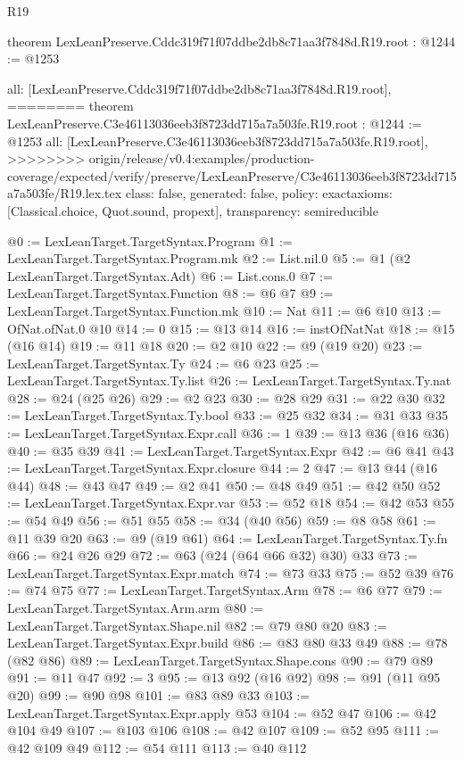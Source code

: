 \begin{lexlean}{R19}
\begin{coremodule}
{{{{{{{{{{{{{theorem LexLeanPreserve.Cddc319f71f07ddbe2db8c71aa3f7848d.R19.root : @1244 := @1253 {
  all: [LexLeanPreserve.Cddc319f71f07ddbe2db8c71aa3f7848d.R19.root],
========
theorem LexLeanPreserve.C3e46113036eeb3f8723dd715a7a503fe.R19.root : @1244 := @1253 {
  all: [LexLeanPreserve.C3e46113036eeb3f8723dd715a7a503fe.R19.root],
>>>>>>>> origin/release/v0.4:examples/production-coverage/expected/verify/preserve/LexLeanPreserve/C3e46113036eeb3f8723dd715a7a503fe/R19.lex.tex
  class: false,
  generated: false,
  policy: exact{axioms: [Classical.choice, Quot.sound, propext]},
  transparency: semireducible
}

@0 := LexLeanTarget.TargetSyntax.Program
@1 := LexLeanTarget.TargetSyntax.Program.mk
@2 := List.nil.{0}
@5 := @1 (@2 LexLeanTarget.TargetSyntax.Adt)
@6 := List.cons.{0}
@7 := LexLeanTarget.TargetSyntax.Function
@8 := @6 @7
@9 := LexLeanTarget.TargetSyntax.Function.mk
@10 := Nat
@11 := @6 @10
@13 := OfNat.ofNat.{0} @10
@14 := 0
@15 := @13 @14
@16 := instOfNatNat
@18 := @15 (@16 @14)
@19 := @11 @18
@20 := @2 @10
@22 := @9 (@19 @20)
@23 := LexLeanTarget.TargetSyntax.Ty
@24 := @6 @23
@25 := LexLeanTarget.TargetSyntax.Ty.list
@26 := LexLeanTarget.TargetSyntax.Ty.nat
@28 := @24 (@25 @26)
@29 := @2 @23
@30 := @28 @29
@31 := @22 @30
@32 := LexLeanTarget.TargetSyntax.Ty.bool
@33 := @25 @32
@34 := @31 @33
@35 := LexLeanTarget.TargetSyntax.Expr.call
@36 := 1
@39 := @13 @36 (@16 @36)
@40 := @35 @39
@41 := LexLeanTarget.TargetSyntax.Expr
@42 := @6 @41
@43 := LexLeanTarget.TargetSyntax.Expr.closure
@44 := 2
@47 := @13 @44 (@16 @44)
@48 := @43 @47
@49 := @2 @41
@50 := @48 @49
@51 := @42 @50
@52 := LexLeanTarget.TargetSyntax.Expr.var
@53 := @52 @18
@54 := @42 @53
@55 := @54 @49
@56 := @51 @55
@58 := @34 (@40 @56)
@59 := @8 @58
@61 := @11 @39 @20
@63 := @9 (@19 @61)
@64 := LexLeanTarget.TargetSyntax.Ty.fn
@66 := @24 @26 @29
@72 := @63 (@24 (@64 @66 @32) @30) @33
@73 := LexLeanTarget.TargetSyntax.Expr.match
@74 := @73 @33
@75 := @52 @39
@76 := @74 @75
@77 := LexLeanTarget.TargetSyntax.Arm
@78 := @6 @77
@79 := LexLeanTarget.TargetSyntax.Arm.arm
@80 := LexLeanTarget.TargetSyntax.Shape.nil
@82 := @79 @80 @20
@83 := LexLeanTarget.TargetSyntax.Expr.build
@86 := @83 @80 @33 @49
@88 := @78 (@82 @86)
@89 := LexLeanTarget.TargetSyntax.Shape.cons
@90 := @79 @89
@91 := @11 @47
@92 := 3
@95 := @13 @92 (@16 @92)
@98 := @91 (@11 @95 @20)
@99 := @90 @98
@101 := @83 @89 @33
@103 := LexLeanTarget.TargetSyntax.Expr.apply @53
@104 := @52 @47
@106 := @42 @104 @49
@107 := @103 @106
@108 := @42 @107
@109 := @52 @95
@111 := @42 @109 @49
@112 := @54 @111
@113 := @40 @112
}}}}}}}}}}}}}}
\end{coremodule}
\end{lexlean}
